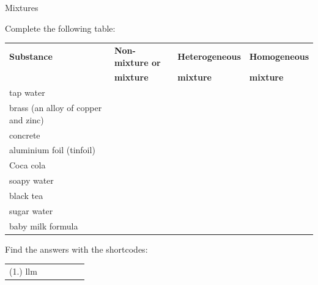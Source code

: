 \label{m38708*secfhsst!!!underscore!!!id169}
\begin{exercises}{Mixtures}
{Complete the following table: \par
\begin{tabular}{|l|l|l|l|}\hline
\textbf{Substance} & \textbf{Non-mixture or} & \textbf{Heterogeneous} & \textbf{Homogeneous} \\ 
 & \textbf{mixture} & \textbf{mixture} & \textbf{mixture} \\ \hline
tap water & & & \\ \hline
brass (an alloy of copper and zinc) & & & \\ \hline
concrete & & & \\ \hline
aluminium foil (tinfoil) & & & \\ \hline
Coca cola & & & \\ \hline
soapy water & & & \\ \hline
black tea & & & \\ \hline
sugar water & & & \\ \hline
baby milk formula & & & \\ \hline
\end{tabular}
    \label{m38708*cid3}
\par {} Find the answers with the shortcodes:
 \par \begin{tabular}[h]{cccccc}
 (1.) llm  & \end{tabular} }
\end{exercises}
